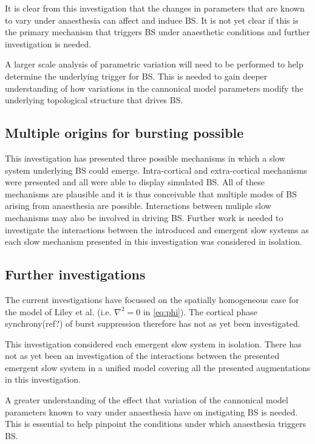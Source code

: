 \documentclass[a4paper,12pt]{article}
\begin{document}
It is clear from this investigation that the changes in parameters that are known to vary under anaesthesia can affect and induce BS. It is not yet clear if this is the primary mechanism that triggers BS under anaesthetic conditions and further investigation is needed. 

A larger scale analysis of parametric variation will need to be performed to help determine the underlying trigger for BS. This is needed to gain deeper understanding of how variations in the cannonical model parameters modify the underlying topological structure that drives BS.

\subsection{Multiple origins for bursting possible}
This investigation has presented three possible mechanisms in which a slow system underlying BS could emerge. Intra-cortical and extra-cortical mechanisms were presented and all were able to display simulated BS. All of these mechanisms are plausible and it is thus conceivable that multiple modes of BS arising from anaesthesia are possible. Interactions between muliple slow mechanisms may also be involved in driving BS. Further work is needed to investigate the interactions
between the introduced and emergent slow systems as each slow mechanism presented in this investigation was considered in isolation.

\subsection{Further investigations}
The current investigations have focussed on the spatially homogeneous case for the model of Liley et al. (i.e. $\nabla^2 =
0$ in \ref{eq:phi}). The cortical phase synchrony(ref?) of burst suppression therefore has not as yet been investigated.

This investigation considered each emergent slow system in isolation. There has not as yet been an investigation of the
interactions between the presented emergent slow system in a unified model covering all the presented augmentations in this investigation.

A greater understanding of the effect that variation of the cannonical model parameters known to vary under anaesthesia have on instigating BS is needed. This is essential to help pinpoint the conditions under which anaesthesia triggers BS.



\end{document}
